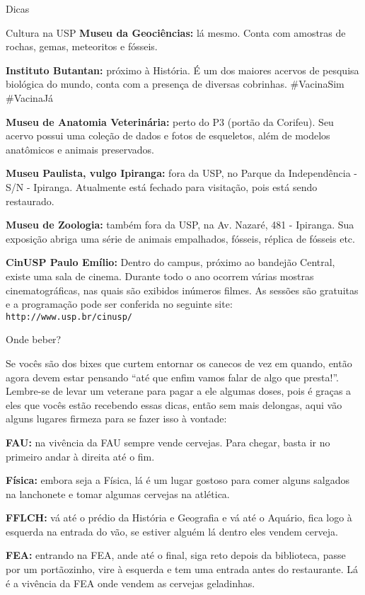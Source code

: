 \begin{secao}{Dicas}
\begin{subsecao}{Cultura na USP}
{\bf Museu da Geociências:} lá mesmo. Conta com amostras de rochas, gemas, meteoritos 
e fósseis.

{\bf Instituto Butantan:} próximo à História. É um dos maiores acervos de pesquisa
biológica do mundo, conta com a presença de diversas cobrinhas. #VacinaSim #VacinaJá

{\bf Museu de Anatomia Veterinária:} perto do P3 (portão da Corifeu). Seu acervo possui
uma coleção de dados e fotos de esqueletos, além de modelos anatômicos e animais
preservados.

{\bf Museu Paulista, vulgo Ipiranga:} fora da USP, no Parque da
Independência - S/N  - Ipiranga. Atualmente está fechado para visitação,
pois está sendo restaurado.

{\bf Museu de Zoologia:} também fora da USP, na Av. Nazaré, 481  -
Ipiranga. Sua exposição abriga uma série de animais empalhados, fósseis,
réplica de fósseis etc.

{\bf CinUSP Paulo Emílio:} Dentro do campus, próximo ao bandejão Central, existe uma sala de cinema. 
Durante todo o ano ocorrem várias mostras cinematográficas, nas quais são exibidos inúmeros filmes. 
As sessões são gratuitas e a programação pode ser conferida no seguinte site: {\tt http://www.usp.br/cinusp/}

\end{subsecao}

\begin{subsecao}{Onde beber?}
	
Se vocês são dos bixes que curtem entornar os canecos de vez em quando, então
agora devem estar pensando ``até que enfim vamos falar de algo que presta!''.
Lembre-se de levar um veterane para pagar a ele algumas doses, pois é graças a
eles que vocês estão recebendo essas dicas, então sem mais delongas, aqui vão
alguns lugares firmeza para se fazer isso à vontade:

{\bf FAU:} na vivência da FAU sempre vende cervejas. Para chegar, basta ir no 
primeiro andar à direita até o fim.

{\bf Física:} embora seja a Física, lá é um lugar gostoso para comer alguns
salgados na lanchonete e tomar algumas cervejas na atlética.

{\bf FFLCH:} vá até o prédio da História e Geografia e vá até o Aquário, fica 
logo à esquerda na entrada do vão, se estiver alguém lá dentro eles vendem cerveja.

{\bf FEA:} entrando na FEA, ande até o final, siga reto depois da biblioteca,
passe por um portãozinho, vire à esquerda e tem uma entrada antes do restaurante.
Lá é a vivência da FEA onde vendem as cervejas geladinhas.


\end{subsecao}
\end{secao}
